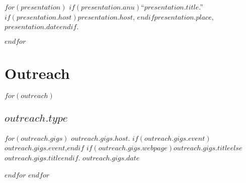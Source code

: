 \documentclass[11pt]{article}
\def\printdate#1{\xprintdate#1-}
\def\xprintdate#1-#2-#3-{#1}
\def\daterange#1#2{\xprintdate#1---\xprintdate#2-}
\begin{document}
$for(presentation)$
$if(presentation.anu)$\ind ``$presentation.title$.'' $if(presentation.host)$\emph{$presentation.host$}, $endif$$presentation.place$, \printdate{$presentation.date$}.

$endif$
$endfor$

\defbibheading{publist}[\bibname]{%
  \subsection{#1}}

\begin{publications}
  \printbibrz{article}{Journal Articles (equal contribution indicated by \**)}
  \printbibrz{conferences}{Conference papers \& posters}
  \printbibrz{commentary}{Commentary}
\end{publications}

\section{Service}

$for(service)$
\subsection{$service.type$}
$for(service.gigs)$
\ind $service.gigs.item$. $if(service.gigs.date)$$service.gigs.date$.$endif$

$endfor$
$endfor$

\section{Editor}

$for(editor)$
\ind \textit{\href{$editor.link$}{$editor.item$}}, $editor.role$. $if(editor.enddate)$\daterange{$editor.begindate$}{$editor.enddate$}$else$\printdate{$editor.begindate$}--$endif$.

$endfor$

\section{Outreach}

$for(outreach)$
\subsection{$outreach.type$}
$for(outreach.gigs)$
\ind $outreach.gigs.host$. $if(outreach.gigs.event)$$outreach.gigs.event$,$endif$ $if(outreach.gigs.webpage)$\href{$outreach.gigs.webpage$}{$outreach.gigs.title$}$else$$outreach.gigs.title$$endif$. $outreach.gigs.date$

$endfor$
$endfor$
\end{document}
